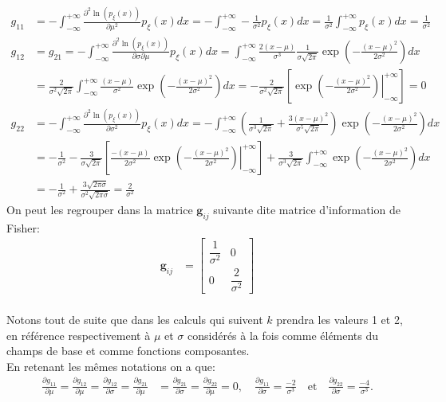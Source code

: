 \documentclass[11pt, letterpaper]{article}
\begin{document}
	    \begin{align*}
	    g_{11}&=-\int_{-\infty}^{+\infty}\frac{\partial^2\ln(p_{\xi}(x))}{\partial\mu^2}p_{\xi}(x)dx=-\int_{-\infty}^{+\infty}-\frac{1}{\sigma^2}p_{\xi}(x)dx=\frac{1}{\sigma^2}\int_{-\infty}^{+\infty}p_{\xi}(x)dx=\frac{1}{\sigma^2}
	    \\
	    g_{12}&=g_{21}=-\int_{-\infty}^{+\infty}\frac{\partial^2\ln(p_{\xi}(x))}{\partial\sigma\partial\mu}p_{\xi}(x)dx=\int_{-\infty}^{+\infty}\frac{2(x-\mu)}{\sigma^3}\frac{1}{\sigma\sqrt{2\pi}}\exp\left(-\frac{(x-\mu)^2}{2\sigma^2}\right)dx\\
	    &=\frac{2}{\sigma^2\sqrt{2\pi}}\int_{-\infty}^{+\infty}\frac{(x-\mu)}{\sigma^2}\exp\left(-\frac{(x-\mu)^2}{2\sigma^2}\right)dx=-\frac{2}{\sigma^2\sqrt{2\pi}}\left[\left.\exp\left(-\frac{(x-\mu)^2}{2\sigma^2}\right)\right|_
	    {-\infty}^{+\infty}\right]=0\\
	    g_{22}&=-\int_{-\infty}^{+\infty}\frac{\partial^2\ln(p_{\xi}(x))}{\partial\sigma^2}p_{\xi}(x)dx=-\int_{-\infty}^{+\infty}\left (\frac{1}{\sigma^3\sqrt{2\pi}}+\frac{3(x-\mu)^2}{\sigma^5\sqrt{2\pi}}\right)\exp\left(-\frac{(x-\mu)^2}{2\sigma^2}\right)dx\\
	    &=-\frac{1}{\sigma^2}
	    -\frac{3}{\sigma\sqrt{2\pi}}\left[\left.\frac{-(x-\mu)}{2\sigma^2}\exp\left(-\frac{(x-\mu)^2}{2\sigma^2}\right)\right|_{-\infty}^{+\infty}\right]+\frac{3}{\sigma^3\sqrt{2\pi}}\int_{-\infty}^{+\infty}\exp\left(-\frac{(x-\mu)^2}{2\sigma^2}\right)dx\\
	    &=-\frac{1}{\sigma^2}+\frac{3\sqrt{2\pi\sigma}}{\sigma^2\sqrt{2\pi\sigma}}=\frac{2}{\sigma^2}
	    \end{align*} 
	On peut les regrouper dans la  matrice $\mathbf{g}_{ij}$ suivante dite matrice d'information de Fisher:
	\begin{align*}
	\mathbf{g}_{ij}
	&=
	    \begin{bmatrix}
	    \dfrac{1}{\sigma^2} & 0
	    \\[9pt]
	    0 & \dfrac{2}{\sigma^2}
	    \end{bmatrix}
	\end{align*}\\
	
	Notons tout de suite que dans les calculs qui suivent $k$ prendra les valeurs 1 et 2, en référence respectivement à $\mu$ et $\sigma$ considérés à la fois comme éléments du champs de base et comme fonctions composantes.\\
	
	En retenant les mêmes notations on a que:
	\begin{align*}
	    \frac{\partial g_{11}}{\partial\mu}=\frac{\partial g_{12}}{\partial\mu}=\frac{\partial g_{12}}{\partial\sigma}=\frac{\partial g_{21}}{\partial\mu}
	    &=\frac{\partial g_{21}}{\partial\sigma}=\frac{\partial g_{22}}{\partial\mu}=0, \quad
	    \frac{\partial g_{11}}{\partial\sigma}=\frac{-2}{\sigma^3} \quad \text{et} \quad
	    \frac{\partial g_{22}}{\partial\sigma}=\frac{-4}{\sigma^3}.
	\end{align*}
	
\end{document}
